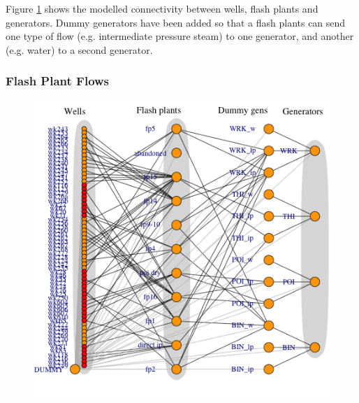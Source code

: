\documentclass[a4paper, 12pt]{article}
\begin{document}
Figure \ref{fig:full_network} shows the modelled connectivity between wells, flash plants and generators. Dummy generators have been added so that a flash plants can send one type of flow (e.g. intermediate pressure steam) to one generator, and another (e.g. water) to a second generator.

\subsubsection{Flash Plant Flows}

\begin{figure}
\centering
\begin{minipage}[t]{.48\textwidth}
  \centering
  \includegraphics[width=\linewidth]{media/full_network}
  \label{fig:full_network}
\end{minipage}\hfill
\begin{minipage}[t]{.48\textwidth}
  \centering

\end{minipage}
\end{figure}
\end{document}
